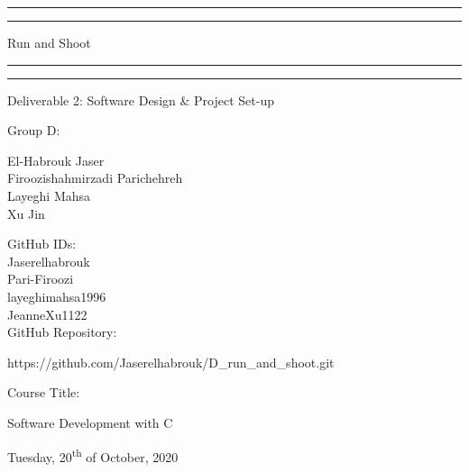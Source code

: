 \documentclass[a4paper, 11pt, oneside]{article}
\begin{document}
 
\begin{titlepage} 
\centering
\vspace*{\baselineskip}
\rule{\textwidth}{1.6pt}\vspace*{-\baselineskip}\vspace*{2pt} 
\rule{\textwidth}{0.4pt} 
\vspace{0.75\baselineskip} 

{\LARGE Run and Shoot}

\vspace{0.75\baselineskip} 
\rule{\textwidth}{0.4pt}\vspace*{-\baselineskip}\vspace{3.2pt}
\rule{\textwidth}{1.6pt}
\vspace{2\baselineskip}

	{\Large Deliverable 2: Software Design \& Project Set-up} %
	
	\vspace*{3\baselineskip} %
	
	
	Group D:
	
	\vspace{2.0\baselineskip} %
	
	{ El-Habrouk Jaser  \\
	Firoozishahmirzadi Parichehreh \\
	Layeghi Mahsa \\
	Xu Jin \\}
	
	\vspace{3\baselineskip} 
	
	GitHub IDs:\\
	\vspace{0.5\baselineskip} %
	Jaserelhabrouk\\
	Pari-Firoozi\\
	layeghimahsa1996\\
	JeanneXu1122\\
	\vspace{2.0\baselineskip} %
	GitHub Repository:
	\vspace{0.5\baselineskip} %
	
	{https://github.com/Jaserelhabrouk/D\_run\_and\_shoot.git}
	
	\vspace{3\baselineskip} %
	
	Course Title:
	\vspace{0.5\baselineskip} %
	
	{\Large Software Development with C} 
	
	\vfill %
	
	
	\vspace{0.3\baselineskip} %
	
	Tuesday, 20\textsuperscript{th} of October, 2020 %
\end{titlepage}
\end{document}
